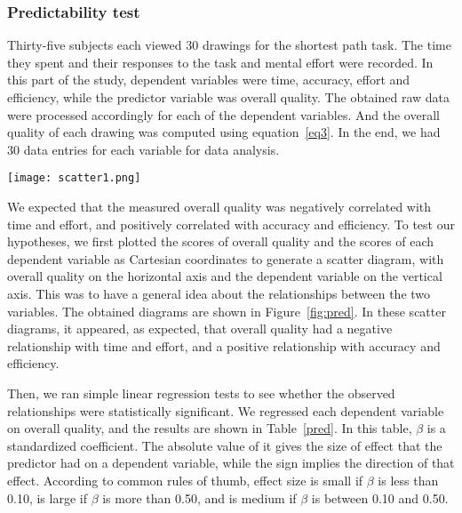 \documentclass[conference,letterpaper]{IEEEtran}
\begin{document}
\subsubsection{Predictability test}

Thirty-five subjects each viewed $30$ drawings for the shortest path task. The time they spent and their responses to the task and mental effort were recorded. In this part of the study, dependent variables were time, accuracy, effort and efficiency, while the predictor variable was overall quality. The obtained raw data were processed accordingly for each of the dependent variables. And the overall quality of each drawing was computed using equation~\ref{eq3}. In the end, we had $30$ data entries for each variable for data analysis. 



 \begin{figure*}[t]
\centering
\texttt{[image: scatter1.png]}
\caption{Scatter diagrams between dependent variables and overall quality} 
\label{fig:pred}
\end{figure*}



We expected that the measured overall quality was negatively correlated with time and effort, and positively correlated with accuracy and efficiency. To test our hypotheses, we first plotted the scores of overall quality and the scores of each dependent variable as Cartesian coordinates to generate a scatter diagram, with overall quality on the horizontal axis and the dependent variable on the vertical axis. This was to have a general idea about the relationships between the two variables. The obtained diagrams are shown in Figure~\ref{fig:pred}. In these scatter diagrams, it appeared, as expected, that overall quality had a negative relationship with time and effort, and a positive relationship with accuracy and efficiency.

Then, we ran simple linear regression tests to see whether the observed relationships were statistically significant. We regressed each dependent variable on overall quality, and the results are shown in Table~\ref{pred}. In this table, $\beta$ is a standardized coefficient. The absolute value of it gives the size of effect that the predictor had on a dependent variable, while the sign implies the direction of that effect. According to common rules of thumb, effect size is small if $\beta$ is less than 0.10, is large if $\beta$ is more than 0.50, and is medium if $\beta$ is between 0.10 and 0.50.
\end{document}
